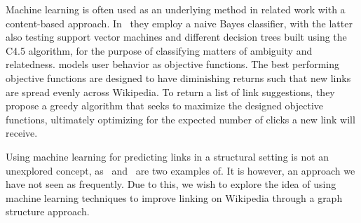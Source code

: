 Machine learning is often used as an underlying method in related work with a content-based approach. In~\cite{mihalcea2007wikify,milne2008learning} they employ a naive Bayes classifier, with the latter also testing support vector machines and different decision trees built using the C4.5 algorithm, for the purpose of classifying matters of ambiguity and relatedness. \cite{hyperlink-structure-using-logs} models user behavior as objective functions. The best performing objective functions are designed to have diminishing returns such that new links are spread evenly across Wikipedia. To return a list of link suggestions, they propose a greedy algorithm that seeks to maximize the designed objective functions, ultimately optimizing for the expected number of clicks a new link will receive.

Using machine learning for predicting links in a structural setting is not an unexplored concept, as~\cite{tang2015line} and~\cite{al2006link} are two examples of. It is however, an approach we have not seen as frequently. Due to this, we wish to explore the idea of using machine learning techniques to improve linking on Wikipedia through a graph structure approach.


